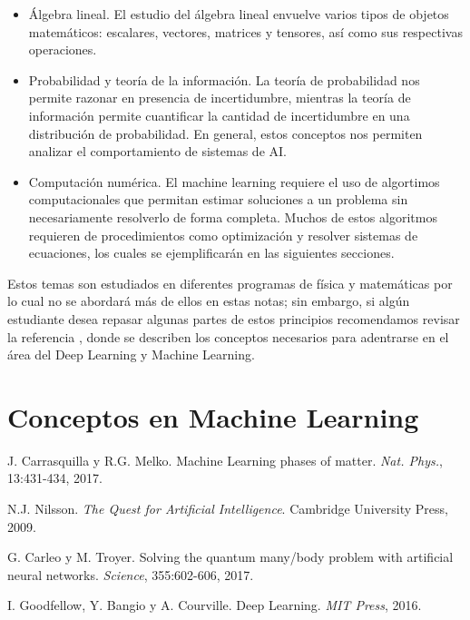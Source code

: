 \documentclass[12pt,oneside,openany]{memoir}
\begin{document}
\begin{itemize}
\item Álgebra lineal. El estudio del álgebra lineal envuelve varios tipos de objetos matemáticos: escalares, vectores, matrices y tensores, así como sus respectivas operaciones.

\item Probabilidad y teoría de la información. La teoría de probabilidad nos permite razonar en presencia de incertidumbre, mientras la teoría de información permite cuantificar la cantidad de incertidumbre en una distribución de probabilidad. En general, estos conceptos nos permiten analizar el comportamiento de sistemas de AI.

\item Computación numérica. El machine learning requiere el uso de algortimos computacionales que permitan estimar soluciones a un problema sin necesariamente resolverlo de forma completa. Muchos de estos algoritmos requieren de procedimientos como optimización y resolver sistemas de ecuaciones, los cuales se ejemplificarán en las siguientes secciones. 
\end{itemize}

Estos temas son estudiados en diferentes programas de física y matemáticas por lo cual no se abordará más de ellos en estas notas; sin embargo, si algún estudiante desea repasar algunas partes de estos principios recomendamos revisar la referencia \cite{Goo16}, donde se describen los conceptos necesarios para adentrarse en el área del Deep Learning y Machine Learning.

\section{Conceptos en Machine Learning}



\begin{thebibliography}{9}

J. Carrasquilla y R.G. Melko. Machine Learning phases of matter. \textit{Nat. Phys.}, 13:431-434, 2017.

N.J. Nilsson. \textit{The Quest for Artificial Intelligence}. Cambridge University Press, 2009.

G. Carleo y M. Troyer. Solving the quantum many/body problem with artificial neural networks. \textit{Science}, 355:602-606, 2017.

I. Goodfellow, Y. Bangio y A. Courville. Deep Learning. \textit{MIT Press}, 2016.
 
% 
\end{thebibliography}
\end{document}
